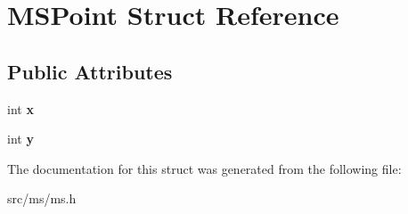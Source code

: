 \hypertarget{structMSPoint}{}\section{M\+S\+Point Struct Reference}
\label{structMSPoint}
\subsection*{Public Attributes}
\begin{DoxyCompactItemize}
\item 
\mbox{\label{structMSPoint_ac2152817f66a26328ac254faa75e3152}} 
int {\bfseries x}
\item 
\mbox{\label{structMSPoint_a69f9951f757c44d02a1eadae7c5fb025}} 
int {\bfseries y}
\end{DoxyCompactItemize}


The documentation for this struct was generated from the following file\+:\begin{DoxyCompactItemize}
\item 
src/ms/ms.\+h\end{DoxyCompactItemize}
